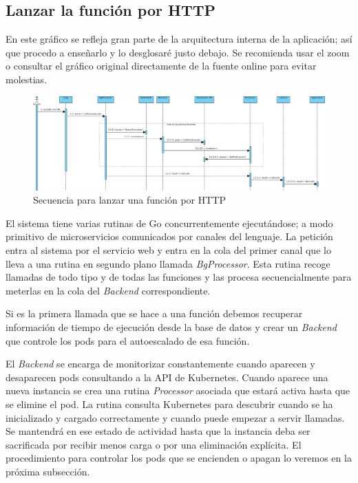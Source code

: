 \subsection{Lanzar la función por HTTP}

En este gráfico se refleja gran parte de la arquitectura interna de la aplicación; así que procedo a enseñarlo y lo desglosaré justo debajo. Se recomienda usar el zoom o consultar el gráfico original directamente de la fuente online para evitar molestias.

\begin{figure}[H]
    \centering
    \includegraphics[width=\textwidth]{../images/secuencia/trigger-http.png}
    \caption{Secuencia para lanzar una función por HTTP}
\end{figure}

El sistema tiene varias rutinas de Go concurrentemente ejecutándose; a modo primitivo de microservicios comunicados por canales del lenguaje. La petición entra al sistema por el servicio web y entra en la cola del primer canal que lo lleva a una rutina en segundo plano llamada \emph{BgProcessor}. Esta rutina recoge llamadas de todo tipo y de todas las funciones y las procesa secuencialmente para meterlas en la cola del \emph{Backend} correspondiente.

Si es la primera llamada que se hace a una función debemos recuperar información de tiempo de ejecución desde la base de datos y crear un \emph{Backend} que controle los pods para el autoescalado de esa función.

El \emph{Backend} se encarga de monitorizar constantemente cuando aparecen y desaparecen pods consultando a la API de Kubernetes. Cuando aparece una nueva instancia se crea una rutina \emph{Processor} asociada que estará activa hasta que se elimine el pod. La rutina consulta Kubernetes para descubrir cuando se ha inicializado y cargado correctamente y cuando puede empezar a servir llamadas. Se mantendrá en ese estado de actividad hasta que la instancia deba ser sacrificada por recibir menos carga o por una eliminación explícita. El procedimiento para controlar los pods que se encienden o apagan lo veremos en la próxima subsección.

